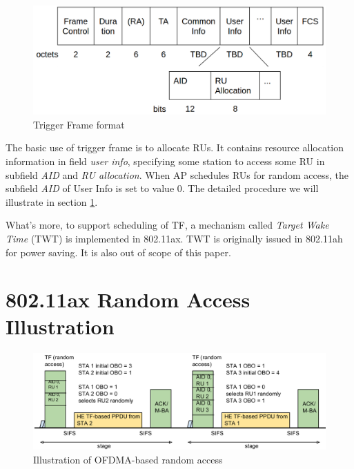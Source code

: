 \begin{figure}[!ht]
\includegraphics[scale=0.2]{./figure/fig_tf_format.png}
\caption{Trigger Frame format}
\label{fig_TF_format}
\end{figure}

The basic use of trigger frame is to allocate RUs. It contains resource allocation information in field \textit{user info}, specifying some station to access some RU in subfield \textit{AID} and \textit{RU allocation}.  
When AP schedules RUs for random access, the subfield \textit{AID} of User Info is set to value 0. The detailed procedure we will illustrate in section \ref{sec_RA_illu}. 

What's more, to support scheduling of TF, a mechanism called \textit{Target Wake Time} (TWT) is implemented in 802.11ax. TWT is originally issued in 802.11ah for power saving\cite{khorov2015survey}. It is also out of scope of this paper.



\section{802.11ax Random Access Illustration}		\label{sec_RA_illu}
\begin{figure}[!hb]
\centering
\includegraphics[scale=0.35]{./figure/RA_illu.png}
\caption{Illustration of OFDMA-based random access}
\label{fig_ra_illu}
\end{figure}

